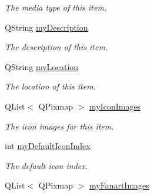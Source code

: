 \begin{DoxyCompactItemize}
\begin{DoxyCompactList}\small\item\em The media type of this item. \end{DoxyCompactList}\item 
\hypertarget{class_a_w_e_1_1_media_item_af1a8ed1e20248528ed1c447daf034084}{Q\-String \hyperlink{class_a_w_e_1_1_media_item_af1a8ed1e20248528ed1c447daf034084}{my\-Description}}\label{class_a_w_e_1_1_media_item_af1a8ed1e20248528ed1c447daf034084}

\begin{DoxyCompactList}\small\item\em The description of this item. \end{DoxyCompactList}\item 
\hypertarget{class_a_w_e_1_1_media_item_aab373d9df4099810136f5c2d9780d635}{Q\-String \hyperlink{class_a_w_e_1_1_media_item_aab373d9df4099810136f5c2d9780d635}{my\-Location}}\label{class_a_w_e_1_1_media_item_aab373d9df4099810136f5c2d9780d635}

\begin{DoxyCompactList}\small\item\em The location of this item. \end{DoxyCompactList}\item 
\hypertarget{class_a_w_e_1_1_media_item_afa43f5fac602b7f56f64bd707c679ac6}{Q\-List$<$ Q\-Pixmap $>$ \hyperlink{class_a_w_e_1_1_media_item_afa43f5fac602b7f56f64bd707c679ac6}{my\-Icon\-Images}}\label{class_a_w_e_1_1_media_item_afa43f5fac602b7f56f64bd707c679ac6}

\begin{DoxyCompactList}\small\item\em The icon images for this item. \end{DoxyCompactList}\item 
\hypertarget{class_a_w_e_1_1_media_item_a8601cb9e3a8154a32d415278e1534bd7}{int \hyperlink{class_a_w_e_1_1_media_item_a8601cb9e3a8154a32d415278e1534bd7}{my\-Default\-Icon\-Index}}\label{class_a_w_e_1_1_media_item_a8601cb9e3a8154a32d415278e1534bd7}

\begin{DoxyCompactList}\small\item\em The default icon index. \end{DoxyCompactList}\item 
\hypertarget{class_a_w_e_1_1_media_item_ab0963052b21ea89b16135540e27025e3}{Q\-List$<$ Q\-Pixmap $>$ \hyperlink{class_a_w_e_1_1_media_item_ab0963052b21ea89b16135540e27025e3}{my\-Fanart\-Images}}\label{class_a_w_e_1_1_media_item_ab0963052b21ea89b16135540e27025e3}


\end{DoxyCompactItemize}
